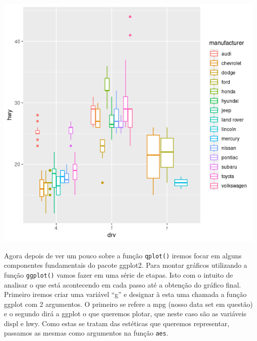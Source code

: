 \documentclass[
]{book}
\begin{document}
\includegraphics{figure/g15.png}

Agora depois de ver um pouco sobre a função \texttt{qplot()} iremos focar em alguns componentes fundamentais do pacote ggplot2. Para montar gráficos utilizando a função \texttt{ggplot()} vamos fazer em uma série de etapas. Isto com o intuito de analisar o que está acontecendo em cada passo até a obtenção do gráfico final. Primeiro iremos criar uma variável ``g'' e designar à esta uma chamada a função ggplot com 2 argumentos. O primeiro se refere a mpg (nosso data set em questão) e o segundo dirá a ggplot o que queremos plotar, que neste caso são as variáveis displ e hwy. Como estas se tratam das estéticas que queremos representar, passamos as mesmas como argumentos na função \texttt{aes}.
\end{document}
